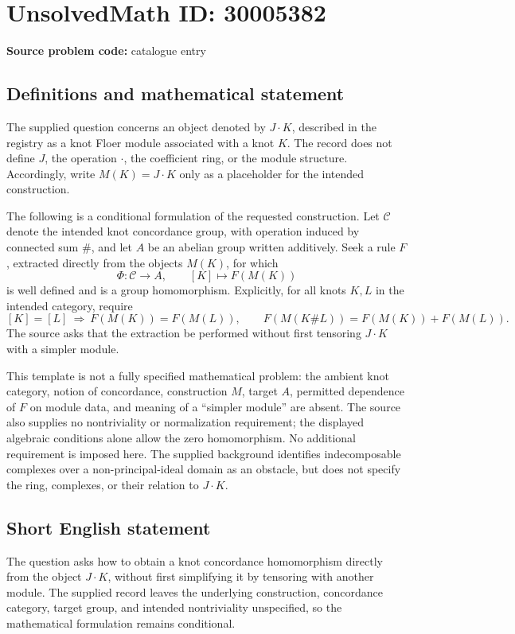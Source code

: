 \documentclass[11pt]{article}
\begin{document}
\section*{UnsolvedMath ID: 30005382}
\textbf{Source problem code:} catalogue entry
\subsection{Definitions and mathematical statement}
The supplied question concerns an object denoted by \(J\cdot K\), described in the registry as a knot Floer module associated with a knot \(K\). The record does not define \(J\), the operation \(\cdot\), the coefficient ring, or the module structure. Accordingly, write \(M(K)=J\cdot K\) only as a placeholder for the intended construction.

The following is a conditional formulation of the requested construction. Let \(\mathcal C\) denote the intended knot concordance group, with operation induced by connected sum \(\#\), and let \(A\) be an abelian group written additively. Seek a rule \(F\), extracted directly from the objects \(M(K)\), for which
\[
\Phi\colon\mathcal C\longrightarrow A,\qquad [K]\longmapsto F(M(K))
\]
is well defined and is a group homomorphism. Explicitly, for all knots \(K,L\) in the intended category, require
\[
[K]=[L]\ \Longrightarrow\ F(M(K))=F(M(L)),
\qquad
F(M(K\# L))=F(M(K))+F(M(L)).
\]
The source asks that the extraction be performed without first tensoring \(J\cdot K\) with a simpler module.

This template is not a fully specified mathematical problem: the ambient knot category, notion of concordance, construction \(M\), target \(A\), permitted dependence of \(F\) on module data, and meaning of a ``simpler module'' are absent. The source also supplies no nontriviality or normalization requirement; the displayed algebraic conditions alone allow the zero homomorphism. No additional requirement is imposed here. The supplied background identifies indecomposable complexes over a non-principal-ideal domain as an obstacle, but does not specify the ring, complexes, or their relation to \(J\cdot K\).
\subsection{Short English statement}
The question asks how to obtain a knot concordance homomorphism directly from the object \(J\cdot K\), without first simplifying it by tensoring with another module. The supplied record leaves the underlying construction, concordance category, target group, and intended nontriviality unspecified, so the mathematical formulation remains conditional.
\end{document}
